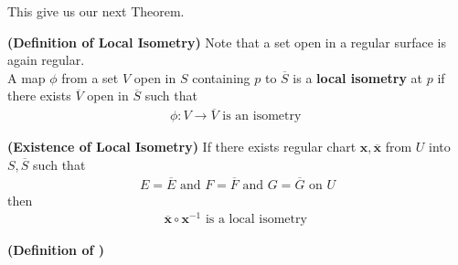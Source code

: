 \documentclass{report}
\begin{document}
\begin{mdframed}
This give us our next Theorem.
\end{mdframed}
\begin{definition}
\textbf{(Definition of Local Isometry)} Note that a set open in a regular surface is again regular.\\

A map $\phi$ from a set $V$ open in $S$  containing $p$ to $\overline{S}$ is a \textbf{local isometry} at $p$ if there exists $\overline{V}$ open in $\overline{S}$ such that 
\begin{align*}
\phi:V\rightarrow \overline{V}\text{ is an isometry }
\end{align*}
\end{definition}
\begin{theorem}
\textbf{(Existence of Local Isometry)} If there exists regular chart $\textbf{x}, \overline{\textbf{x}}$ from $U$ into $S,\overline{S}$ such that 
\begin{align*}
E=\overline{E}\text{ and }F=\overline{F}\text{ and }G=\overline{G}\text{ on }U
\end{align*}
then 
\begin{align*}
\overline{\textbf{x}}\circ \textbf{x}^{-1}\text{ is a local isometry }
\end{align*}
\end{theorem}
\begin{definition}
\textbf{(Definition of )}
\end{definition}
\end{document}
